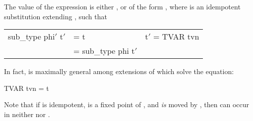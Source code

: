 The value of the expression is either , or of the form ,
where  is an idempotent substitution extending , such that
\begin{mlcoded}
\begin{tabular}{lll}
    sub\_type phi$'$ t$'$ &= t  & {\normalfont{if}} t$'$ = TVAR tvn\\
    &= sub\_type phi t$'$\phantom{hack} & {\normalfont{otherwise}}
\end{tabular}
\end{mlcoded}
In fact,  is maximally general among extensions of  which solve the equation:
\begin{mlcoded}
    TVAR tvn = t
\end{mlcoded}
Note that if  is idempotent,  is a fixed point of , and  \textit{is} moved by ,
then  can occur in neither  nor .

